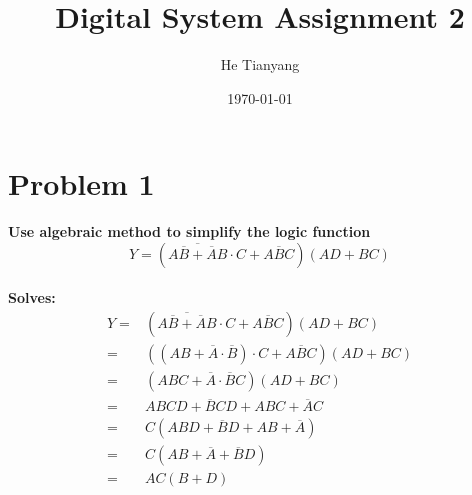 \documentclass{article}
\title{Digital System Assignment 2}
\author{He Tianyang}
\date{\today}
\begin{document}
\maketitle

\section*{Problem 1}
\textbf{Use algebraic method to simplify the logic function}
\begin{equation}
    Y = (\overline{A\overline{B}+\overline{A}B}\cdot C+A\overline{B}C)(AD+BC)
\end{equation}
\\
\textbf{Solves:}
\begin{align*}
    Y  = & (\overline{A\overline{B}+\overline{A}B}\cdot C+A\overline{B}C)(AD+BC) \\
    =    & ((AB+\overline{A}\cdot\overline{B})\cdot C+A\overline{B}C)(AD+BC)     \\
    =    & (ABC+\overline{A}\cdot\overline{B}C)(AD+BC)                           \\
    =    & ABCD+\overline{B}CD+ABC+\overline{A}C                                 \\
    =    & C(ABD+\overline{B}D+AB+\overline{A})                                  \\
    =    & C(AB+\overline{A}+\overline{B}D)                                      \\
    =    & \boxed{AC(B+D)}
\end{align*}
\end{document}
